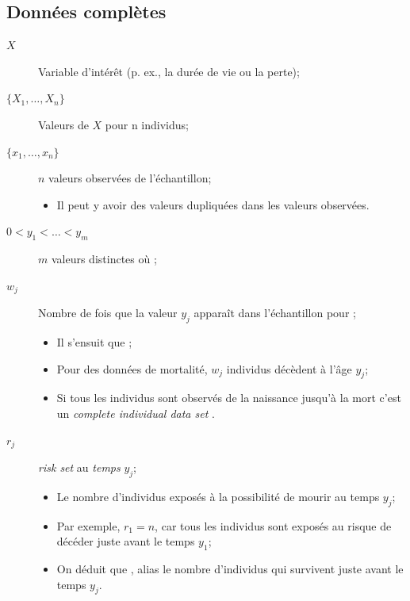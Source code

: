 \documentclass[french]{article}
\begin{document}
\begin{multicols*}{2}
\columnbreak
\subsection{Données complètes}
\begin{distributions}[Notation]
\begin{description}
	\item[$X$]	Variable d'intérêt (p. ex., la durée de vie ou la perte);
	\item[$\{X_{1}, \dots, X_{n}\}$]	Valeurs de $X$ pour n individus;
	\item[$\{x_{1}, \dots, x_{n}\}$]	$n$ valeurs observées de l'échantillon;
		\begin{itemize}[leftmargin = *]
		\item	Il peut y avoir des valeurs dupliquées dans les valeurs observées.
		\end{itemize}
	\item[$0	<	y_{1}	<	\hdots	<	y_{m}$]	$m$ valeurs distinctes où ;
	\item[$w_{j}$]	Nombre de fois que la valeur $y_{j}$ apparaît dans l'échantillon pour ;
		\begin{itemize}[leftmargin = *]
		\item	Il s'ensuit que ;
		\item	Pour des données de mortalité, $w_{j}$ individus décèdent à l'âge $y_{j}$;
		\item	Si tous les individus sont observés de la naissance jusqu'à la mort c'est un \og \textit{complete individual data set} \fg{}.
		\end{itemize}
	\item[$r_{j}$]	\og \textit{risk set} \fg{} au \textit{temps} $y_{j}$;
		\begin{itemize}
		\item	Le nombre d'individus exposés à la possibilité de mourir au temps $y_{j}$;
		\item	Par exemple, $r_{1}	=	n$, car tous les individus sont exposés au risque de décéder juste avant le temps $y_{1}$;
		\item	On déduit que , alias le nombre d'individus qui survivent juste avant le temps $y_{j}$.
		\end{itemize}
\end{description}
\end{distributions}




\end{multicols*}
\end{document}
